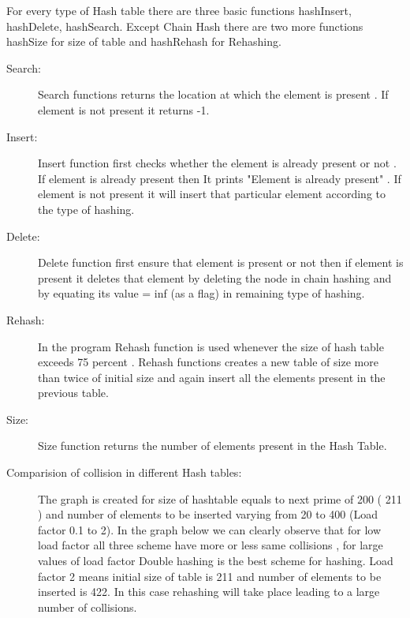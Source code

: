 \documentclass[a4paper,11pt]{article}
\begin{document}
For every type of Hash table there are three basic functions hashInsert, hashDelete, hashSearch. Except Chain Hash there are two more functions hashSize for size of table and hashRehash for Rehashing. 
\begin{description}  
\item[Search:]
Search functions returns the location at which the element is present . If element is not present it returns -1.
\item[Insert:]
Insert function first checks whether the element is already present or not . If element is already present then It prints "Element is already present" . If element is not present it will insert that particular element according to the type of hashing.
\item[Delete:]
Delete function first ensure that element is present or not then if element is present it  deletes that element by deleting the node in chain hashing and by equating its value  = inf (as a flag) in  remaining type of hashing.
\item[Rehash:]
In the program Rehash function is used whenever the size of hash table exceeds 75 percent . Rehash functions creates a new table of size more than twice of initial size and again insert all the elements present in the previous table.
\item[Size:]
Size function returns the number of elements present in the Hash Table.
\item[Comparision of collision in different  Hash tables: ]
The graph is created for size of hashtable equals to next prime of 200 ( 211 ) and number of elements to be inserted  varying from 20 to 400 (Load factor 0.1 to 2). In the graph below we can clearly observe that for low load factor all three scheme have more or less same collisions , for large values of load factor Double hashing is the best scheme for hashing. Load factor 2 means initial size of table is 211 and number of elements to be inserted is 422. In this case rehashing will take place leading to a large number of collisions.
\end{description}


\end{document}
